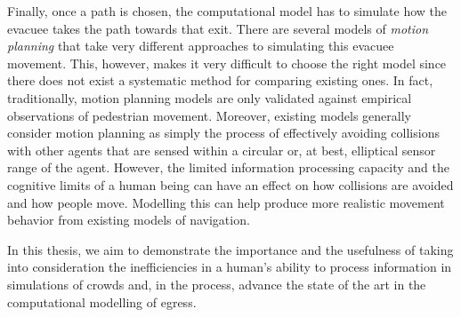Finally, once a path is chosen, the computational model has to simulate how the evacuee takes the path towards that exit. There are several models of \emph{motion planning} that take very different approaches to simulating this evacuee movement. This, however, makes it very difficult to choose the right model since there does not exist a systematic method for comparing existing ones. In fact, traditionally, motion planning models are only validated against empirical observations of pedestrian movement. Moreover, existing models generally consider motion planning as simply the process of effectively avoiding collisions with other agents that are sensed within a circular or, at best, elliptical sensor range of the agent. However, the limited information processing capacity and the cognitive limits of a human being can have an effect on how collisions are avoided and how people move. Modelling this can help produce more realistic movement behavior from existing models of navigation.

In this thesis, we aim to demonstrate the importance and the usefulness of taking into consideration the inefficiencies in a human's ability to process information in simulations of crowds and, in the process, advance the state of the art in the computational modelling of egress.





